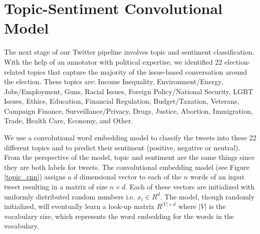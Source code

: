 \documentclass[letterpaper]{article}
\begin{document}
%


\section{Topic-Sentiment Convolutional Model}
The next stage of our Twitter pipeline involves topic and sentiment classification. With the help of an annotator with political expertise, we identified 22 election-related topics that capture the majority of the issue-based conversation around the election. These topics are: Income Inequality, Environment/Energy, Jobs/Employment, Guns, Racial Issues, Foreign Policy/National Security, LGBT Issues, Ethics, Education, Financial Regulation, Budget/Taxation, Veterans, Campaign Finance, Surveillance/Privacy, Drugs, Justice, Abortion, Immigration, Trade, Health Care, Economy, and Other.

We use a convolutional word embedding model to classify the tweets into these 22 different topics and to predict their sentiment (positive, negative or neutral). From the perspective of the model, topic and sentiment are the same things since they are both labels for tweets. The convolutional embedding model (see Figure \ref{topic_cnn}) assigns a $d$ dimensional
vector to each of the $n$ words of an input tweet resulting in a matrix of size $n \times d$. Each of these vectors are initialized with uniformly distributed random numbers i.e. $x_i \in {R}^d$. The model, though randomly initialized, will eventually learn a look-up matrix ${R}^{|V|\times d}$ where $|V|$ is the vocabulary size, which represents the word embedding for the words in the vocabulary.
\end{document}

